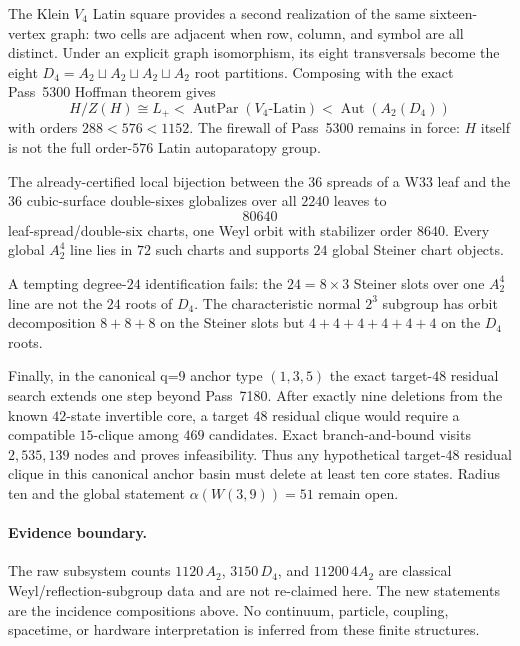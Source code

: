 The Klein $V_4$ Latin square provides a second realization of the same sixteen-vertex graph: two cells are adjacent when row, column, and symbol are all distinct.  Under an explicit graph isomorphism, its eight transversals become the eight $D_4=A_2\sqcup A_2\sqcup A_2\sqcup A_2$ root partitions.  Composing with the exact Pass~5300 Hoffman theorem gives
\[
  \boxed{H/Z(H)\cong L_+<\operatorname{AutPar}(V_4\text{-Latin})<\operatorname{Aut}(A_2(D_4))}
\]
with orders $288<576<1152$.  The firewall of Pass~5300 remains in force: $H$ itself is not the full order-$576$ Latin autoparatopy group.

The already-certified local bijection between the $36$ spreads of a W33 leaf and the $36$ cubic-surface double-sixes globalizes over all $2240$ leaves to
\[
  \boxed{80640}
\]
leaf-spread/double-six charts, one Weyl orbit with stabilizer order $8640$.  Every global $A_2^4$ line lies in $72$ such charts and supports $24$ global Steiner chart objects.

A tempting degree-$24$ identification fails: the $24=8\times3$ Steiner slots over one $A_2^4$ line are not the $24$ roots of $D_4$.  The characteristic normal $2^3$ subgroup has orbit decomposition $8+8+8$ on the Steiner slots but $4+4+4+4+4+4$ on the $D_4$ roots.

Finally, in the canonical q=9 anchor type $(1,3,5)$ the exact target-$48$ residual search extends one step beyond Pass~7180.  After exactly nine deletions from the known $42$-state invertible core, a target $48$ residual clique would require a compatible $15$-clique among $469$ candidates.  Exact branch-and-bound visits $2{,}535{,}139$ nodes and proves infeasibility.  Thus any hypothetical target-$48$ residual clique in this canonical anchor basin must delete at least ten core states.  Radius ten and the global statement $\alpha(W(3,9))=51$ remain open.

\paragraph{Evidence boundary.}
The raw subsystem counts $1120\,A_2$, $3150\,D_4$, and $11200\,4A_2$ are classical Weyl/reflection-subgroup data and are not re-claimed here.  The new statements are the incidence compositions above.  No continuum, particle, coupling, spacetime, or hardware interpretation is inferred from these finite structures.
